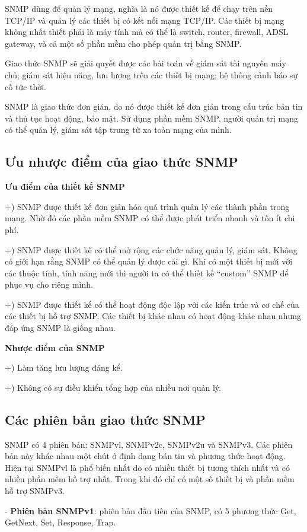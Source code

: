 \documentclass[12pt,oneside,a4paper,reqno]{report}
\begin{document}
\begin{large}
SNMP dùng để quản lý mạng, nghĩa là nó được thiết kế để chạy trên nền TCP/IP và quản lý các thiết bị có kết nối mạng TCP/IP. Các thiết bị mạng không nhất thiết phải là máy tính mà có thể là switch, router, firewall, ADSL gateway, và cả một số phần mềm cho phép quản trị bằng SNMP.

Giao thức SNMP sẽ giải quyết được các bài toán về giám sát tài nguyên máy chủ; giám sát hiệu năng, lưu lượng trên các thiết bị mạng; hệ thống cảnh báo sự cố tức thời.

SNMP là giao thức đơn giản, do nó được thiết kế đơn giản trong cấu trúc bản tin và thủ tục hoạt động, bảo mật. Sử dụng phần mềm SNMP, người quản trị mạng có thể quản lý, giám sát tập trung từ xa toàn mạng của mình.
\subsection{Ưu nhược điểm của giao thức SNMP}

\textbf{Ưu điểm của thiết kế SNMP}

+) SNMP được thiết kế đơn giản hóa quá trình quản lý các thành phần trong mạng. Nhờ đó các phần mềm SNMP có thể được phát triển nhanh và tốn ít chi phí.

+) SNMP được thiết kế có thể mở rộng các chức năng quản lý, giám sát. Không có giới hạn rằng SNMP có thể quản lý được cái gì. Khi có một thiết bị mới với các thuộc tính, tính năng mới thì người ta có thể thiết kế “custom” SNMP để phục vụ cho riêng mình.

+) SNMP được thiết kế có thể hoạt động độc lập với các kiến trúc và cơ chế của các thiết bị hỗ trợ SNMP. Các thiết bị khác nhau có hoạt động khác nhau nhưng đáp ứng SNMP là giống nhau.

\textbf{Nhược điểm của SNMP}

+) Làm tăng lưu lượng đáng kể.

+) Không có sự điều khiển tổng hợp của nhiều nơi quản lý.
\subsection{Các phiên bản giao thức SNMP}
SNMP có 4 phiên bản: SNMPvl, SNMPv2c, SNMPv2u và SNMPv3. Các phiên bản này khác nhau một chút ớ định dạng bán tin và phương thức hoạt động. Hiện tại SNMPvl là phổ biến nhất do có nhiều thiết bị tương thích nhất và có nhiều phần mềm hồ trợ nhất. Trong khi đó chỉ có một số thiết bị và phần mềm hỗ trợ SNMPv3.

- \textbf{Phiên bản SNMPv1}: phiên bản đầu tiên của SNMP, có 5 phương thức Get, GetNext, Set, Response, Trap. 


\end{large}
\end{document}
